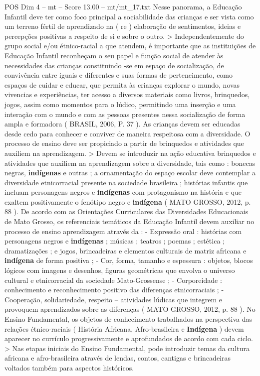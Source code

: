 \begin{textsample}{POS Dim 4 – mt – Score 13.00 – mt/mt\_17.txt}
Nesse panorama, a Educação Infantil deve ter como foco principal a sociabilidade das crianças e ser vista como um terreno fértil de aprendizado na ( re ) elaboração de sentimentos, ideias e percepções positivas a respeito de si e sobre o outro. > Independentemente do grupo social e/ou étnico-racial a que atendem, é importante que as instituições de Educação Infantil reconheçam o seu papel e função social de atender às necessidades das crianças constituindo -se em espaço de socialização, de convivência entre iguais e diferentes e suas formas de pertencimento, como espaços de cuidar e educar, que permita às crianças explorar o mundo, novas vivencias e experiências, ter acesso a diversos materiais como livros, brinquedos, jogos, assim como momentos para o lúdico, permitindo uma inserção e uma interação com o mundo e com as pessoas presentes nessa socialização de forma ampla e formadora ( BRASIL, 2006, P. 37 ).
As crianças devem ser educadas desde cedo para conhecer e conviver de maneira respeitosa com a diversidade.
O processo de ensino deve ser propiciado a partir de brinquedos e atividades que auxiliem na aprendizagem. > Devem se introduzir na ação educativa brinquedos e atividades que auxiliem na aprendizagem sobre a diversidade, tais como : bonecas negras, \textbf{indígenas} e outras ; a ornamentação do espaço escolar deve contemplar a diversidade etnicorracial presente na sociedade brasileira ; histórias infantis que incluam personagens negros e \textbf{indígenas} com protagonismo na história e que exaltem positivamente o fenótipo negro e \textbf{indígena} ( MATO GROSSO, 2012, p. 88 ).
De acordo com as Orientações Curriculares das Diversidades Educacionais de Mato Grosso, os referenciais temáticos da Educação Infantil devem auxiliar no processo de ensino aprendizagem através da : - Expressão oral : histórias com personagens negros e \textbf{indígenas} ; músicas ; teatros ; poemas ; estética ; dramatizações ; e jogos, brincadeiras e elementos culturais de matriz africana e \textbf{indígena} de forma positiva ; - Cor, forma, tamanho e espessura : objetos, blocos lógicos com imagens e desenhos, figuras geométricas que envolva o universo cultural e etnicorracial da sociedade Mato-Grossense ; - Corporeidade : conhecimento e reconhecimento positivo das diferenças etnicorraciais ; - Cooperação, solidariedade, respeito – atividades lúdicas que integrem e provoquem aprendizados sobre as diferenças ( MATO GROSSO, 2012, p. 88 ).
No Ensino Fundamental, os objetos de conhecimento trabalhados na perspectiva das relações étnico-raciais ( História Africana, Afro-brasileira e \textbf{Indígena} ) devem aparecer no currículo progressivamente e aprofundados de acordo com cada ciclo. > Nas etapas iniciais do Ensino Fundamental, pode introduzir temas da cultura africana e afro-brasileira através de lendas, contos, cantigas e brincadeiras voltados também para aspectos históricos.

\end{textsample}
